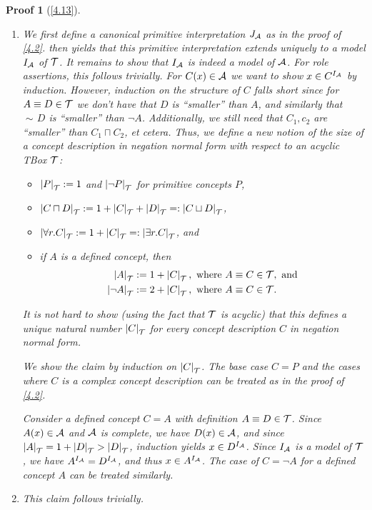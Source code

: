 \documentclass[openany]{scrbook}
\theoremstyle{break}
\theoremstyle{nonumberbreak}
\theoremstyle{nonumberplain}
\theoremstyle{nonumberbreak}
\newtheorem{Proof}{Proof}
\newcommand{\then}{\Longrightarrow}
\newcommand{\abs}[2][]{\left|{#2}\right|\ifx#1\then\else_{#1}\fi}
\newcommand{\nnf}{\mathop{\sim\!}}
\begin{document}
\begin{Proof}[\cref{4.13}]
  \begin{enumerate}
  \item We first define a canonical primitive interpretation $J_{\cal
      A}$ as in the proof of \cref{4.2}.  then yields that
    this primitive interpretation extends uniquely to a model $I_{\cal
      A}$ of ${\cal T}$. It remains to show that $I_{\cal A}$ is
    indeed a model of ${\cal A}$. For role assertions, this follows
    trivially. For $C(x) \in {\cal A}$ we want to show $x \in
    C^{I_{\cal A}}$ by induction. However, induction on the structure
    of $C$ falls short since for $A \equiv D \in {\cal T}$ we don't
    have that $D$ is ``smaller'' than $A$, and similarly that $\nnf D$
    is ``smaller'' than $\neg A$. Additionally, we still need that
    $C_1, c_2$ are ``smaller'' than $C_1 \sqcap C_2$, et cetera. Thus,
    we define a new notion of the size of a concept description in
    negation normal form with respect to an acyclic TBox ${\cal T}$:
    \begin{itemize}
    \item $\abs[{\cal T}]{P} := 1$ and $\abs[{\cal T}]{\neg P}$ for
      primitive concepts $P$,
    \item $\abs[{\cal T}]{C \sqcap D} := 1 + \abs[{\cal T}]{C} +
      \abs[{\cal T}]{D} =: \abs[{\cal T}]{C \sqcup D}$,
    \item $\abs[{\cal T}]{\forall r. C} := 1 + \abs[{\cal T}]{C} =:
      \abs[{\cal T}]{\exists r.C}$, and
    \item if $A$ is a defined concept, then
      \begin{align*}
        \abs[{\cal T}]{A} & := 1 + \abs[{\cal T}]{C},\  \text{where}\
        A \equiv C \in {\cal T},\ \text{and} \\
        \abs[{\cal T}]{\neg A} & := 2 + \abs[{\cal T}]{C},
        \ \text{where}\ A \equiv C \in {\cal T}.
      \end{align*}
    \end{itemize}

    It is not hard to show (using the fact that ${\cal T}$ is acyclic)
    that this defines a unique natural number $\abs[{\cal T}]{C}$ for
    every concept description $C$ in negation normal form.

    We show the claim by induction on $\abs[{\cal T}]{C}$. The base
    case $C = P$ and the cases where $C$ is a complex concept
    description can be treated as in the proof of \cref{4.2}.

    Consider a defined concept $C = A$ with definition $A
    \equiv D \in {\cal T}$. Since $A(x) \in {\cal A}$ and ${\cal A}$
    is complete, we have $D(x) \in {\cal A}$, and since $\abs[{\cal
      T}]{A} = 1 + \abs[{\cal T}]{D} > \abs[{\cal T}]{D}$, induction
    yields $x \in D^{I_{\cal A}}$. Since $I_{\cal A}$ is a model of
    ${\cal T}$, we have $A^{I_{\cal A}} = D^{I_{\cal A}}$, and thus $x
    \in A^{I_{\cal A}}$.
    The case of $C = \neg A$ for a defined concept $A$ can be treated
    similarly.
  \item This claim follows trivially.
  \end{enumerate}
\end{Proof}
\end{document}
